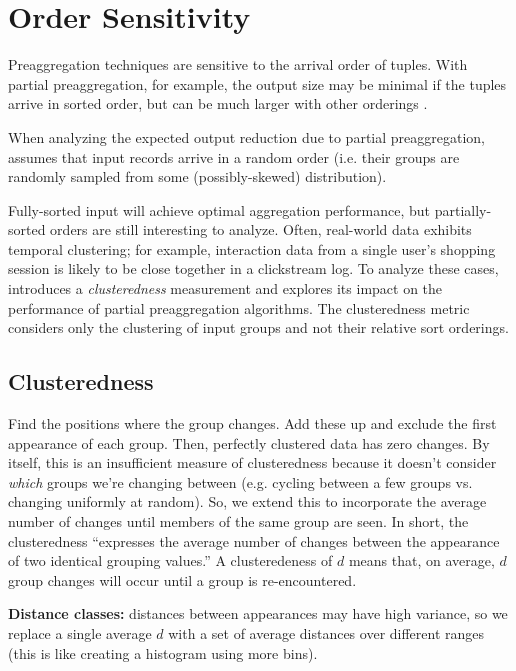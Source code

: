 \documentclass[12pt]{article}
\begin{document}

\section{Order Sensitivity}
Preaggregation techniques are sensitive to the arrival order of tuples.  With partial preaggregation, for example, the output size may be minimal if the tuples arrive in sorted order, but can be much larger with other orderings \cite{partial-preaggregation}.

When analyzing the expected output reduction due to partial preaggregation, \cite{partial-preaggregation} assumes that input records arrive in a random order (i.e. their groups are randomly sampled from some (possibly-skewed) distribution).

Fully-sorted input will achieve optimal aggregation performance, but partially-sorted orders are still interesting to analyze.  Often, real-world data exhibits temporal clustering; for example, interaction data from a single user's shopping session is likely to be close together in a clickstream log.  To analyze these cases, \cite{estimating-cardinality} introduces a \emph{clusteredness} measurement and explores its impact on the performance of partial preaggregation algorithms.  The clusteredness metric considers only the clustering of input groups and not their relative sort orderings.

\subsection{Clusteredness}

Find the positions where the group changes.  Add these up and exclude the first appearance of each group.  Then, perfectly clustered data has zero changes.  By itself, this is an insufficient measure of clusteredness because it doesn't consider \emph{which} groups we're changing between (e.g. cycling between a few groups vs. changing uniformly at random).  So, we extend this to incorporate the average number of changes until members of the same group are seen.  In short, the clusteredness ``expresses the average number of changes between the appearance of two identical grouping values.''  A clusteredeness of $d$ means that, on average, $d$ group changes will occur until a group is re-encountered.


\textbf{Distance classes:} distances between appearances may have high variance, so we replace a single average $d$ with a set of average distances over different ranges (this is like creating a histogram using more bins).
\end{document}
